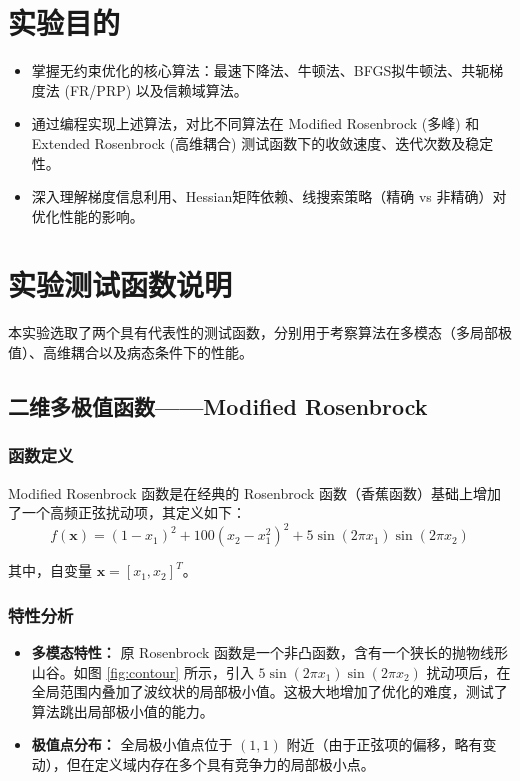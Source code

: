 \documentclass[a4paper,12pt]{article}
\begin{document}
\clearpage 
\setcounter{page}{1} 

\section{实验目的}
\begin{itemize}
    \item 掌握无约束优化的核心算法：最速下降法、牛顿法、BFGS拟牛顿法、共轭梯度法 (FR/PRP) 以及信赖域算法。
    \item 通过编程实现上述算法，对比不同算法在 Modified Rosenbrock (多峰) 和 Extended Rosenbrock (高维耦合) 测试函数下的收敛速度、迭代次数及稳定性。
    \item 深入理解梯度信息利用、Hessian矩阵依赖、线搜索策略（精确 vs 非精确）对优化性能的影响。
\end{itemize}

\section{实验测试函数说明}

本实验选取了两个具有代表性的测试函数，分别用于考察算法在多模态（多局部极值）、高维耦合以及病态条件下的性能。

\subsection{二维多极值函数——Modified Rosenbrock}

\subsubsection{函数定义}
Modified Rosenbrock 函数是在经典的 Rosenbrock 函数（香蕉函数）基础上增加了一个高频正弦扰动项，其定义如下：
\begin{equation}
    f(\bm{x}) = (1 - x_1)^2 + 100(x_2 - x_1^2)^2 + 5 \sin(2\pi x_1) \sin(2\pi x_2)
\end{equation}

其中，自变量 $\bm{x} = [x_1, x_2]^T$。

\subsubsection{特性分析}
\begin{itemize}
    \item \textbf{多模态特性：} 原 Rosenbrock 函数是一个非凸函数，含有一个狭长的抛物线形山谷。如图 \ref{fig:contour} 所示，引入 $5 \sin(2\pi x_1) \sin(2\pi x_2)$ 扰动项后，在全局范围内叠加了波纹状的局部极小值。这极大地增加了优化的难度，测试了算法跳出局部极小值的能力。
    \item \textbf{极值点分布：} 全局极小值点位于 $(1,1)$ 附近（由于正弦项的偏移，略有变动），但在定义域内存在多个具有竞争力的局部极小点。
\end{itemize}
\end{document}
